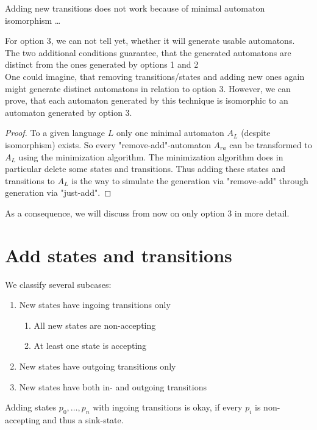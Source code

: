 \documentclass[a4paper, oneside, 11pt]{report}
\theoremstyle{definition}
\theoremstyle{remark}
\begin{document}
Adding new transitions does not work because of minimal automaton isomorphism \ldots

For option 3, we can not tell yet, whether it will generate usable automatons. The two additional conditions guarantee, that the generated automatons are distinct from the ones generated by options 1 and 2 \\

\noindent One could imagine, that removing transitions/states and adding new ones again might generate distinct automatons in relation to option 3. However, we can prove, that each automaton generated by this technique is isomorphic to an automaton generated by option 3.

\begin{proof}
	To a given language $L$ only one minimal automaton $A_L$ (despite isomorphism) exists.
	So every "remove-add"-automaton $A_{ra}$ can be transformed to $A_L$ using the minimization algorithm.
	The minimization algorithm does in particular delete some states and transitions.
	Thus adding these states and transitions to $A_L$ is the way to simulate the generation via "remove-add" through generation via "just-add".
\end{proof}
\noindent As a consequence, we will discuss from now on only option 3 in more detail.

\section{Add states and transitions}

We classify several subcases:

\begin{enumerate}
	\item New states have ingoing transitions only
	\begin{enumerate}
		\item All new states are non-accepting
		\item At least one state is accepting
	\end{enumerate}
	\item New states have outgoing transitions only
	\item New states have both in- and outgoing transitions
\end{enumerate}
Adding states $p_0, \ldots, p_n$ with ingoing transitions is okay, if every $p_i$ is non-accepting and thus a sink-state.
\end{document}
